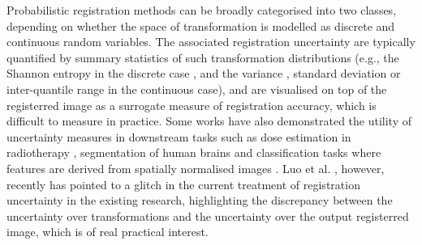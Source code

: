 Probabilistic registration methods can be broadly categorised into two classes, depending on whether the space of transformation is modelled as discrete \cite{cobzas2011random,popuri2013variational,heinrich2016deformable} and continuous \cite{van2008encoding,simpson2012probabilistic,risholm2013bayesian,zhang2013bayesian,wassermann2014probabilistic,simpson2015probabilistic,le2016quantifying} random variables. The associated registration uncertainty are typically quantified by summary statistics of such transformation distributions (e.g., the Shannon entropy in the discrete case \cite{lotfi2013improving}, and the variance \cite{simpson2012probabilistic,le2016quantifying}, standard deviation\cite{simpson2015probabilistic} or inter-quantile range \cite{risholm2013bayesian,risholm2010summarizing} in the continuous case), and are visualised on top of the registerred image as a surrogate measure of registration accuracy, which is difficult to measure in practice. Some works have also demonstrated the utility of uncertainty measures in downstream tasks such as dose estimation in radiotherapy \cite{risholm2011estimation}, segmentation of human brains \cite{simpson2011probabilistic} and classification tasks where features are derived from spatially normalised images \cite{simpson2012ensemble}. Luo et al. \cite{wells2018miccai}, however, recently has pointed to a glitch in the current treatment of registration uncertainty in the existing research, highlighting the discrepancy between the  uncertainty over transformations and the uncertainty over the output registerred image, which is of real practical interest. 




%
%



